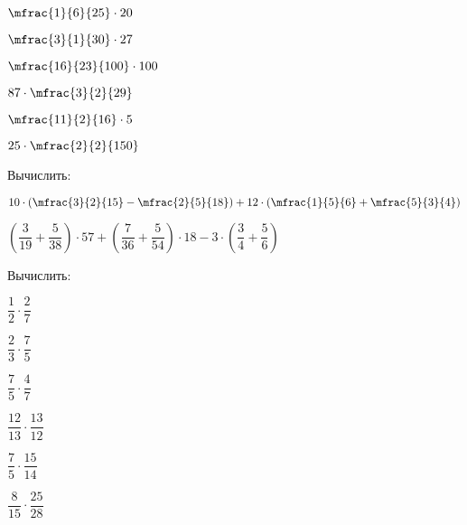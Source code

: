 \begin{class}[number=3]
\begin{listofex}
\begin{enumcols}[itemcolumns=4]
			\item \( \mfrac{1}{6}{25}\cdot20 \)
			\item \( \mfrac{3}{1}{30}\cdot27 \)
			\item \( \mfrac{16}{23}{100}\cdot100 \)
			\item \( 87\cdot\mfrac{3}{2}{29} \)
			\item \( \mfrac{11}{2}{16}\cdot5 \)
			\item \( 25\cdot\mfrac{2}{2}{150} \)
		\end{enumcols}
		\item Вычислить:
		\begin{enumcols}[itemcolumns=1]
			\item \( 10\cdot\left( \mfrac{3}{2}{15}-\mfrac{2}{5}{18} \right)+12\cdot\left( \mfrac{1}{5}{6}+\mfrac{5}{3}{4} \right) \)
			\item \( \left( \dfrac{3}{19}+\dfrac{5}{38} \right)\cdot57+\left( \dfrac{7}{36}+\dfrac{5}{54} \right)\cdot18-3\cdot\left( \dfrac{3}{4}+\dfrac{5}{6} \right) \)
		\end{enumcols}
		\item Вычислить:
		\begin{enumcols}[itemcolumns=3]
			\item \( \dfrac{1}{2}\cdot\dfrac{2}{7} \)
			\item \( \dfrac{2}{3}\cdot\dfrac{7}{5} \)
			\item \( \dfrac{7}{5}\cdot\dfrac{4}{7} \)
			\item \( \dfrac{12}{13}\cdot\dfrac{13}{12} \)
			\item \( \dfrac{7}{5}\cdot\dfrac{15}{14} \)
			\item \( \dfrac{8}{15}\cdot\dfrac{25}{28} \)
		\end{enumcols}
	\end{listofex}
\end{class}
